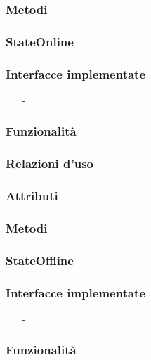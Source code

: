 \subsubsection*{Metodi}

\subsubsection{StateOnline}\label{sec:stateonline}

\subsubsection*{Interfacce implementate}
\begin{itemize}[noitemsep,nolistsep]
  \item[-]
\end{itemize}

\subsubsection*{Funzionalità}

\subsubsection*{Relazioni d'uso}

\subsubsection*{Attributi}

\subsubsection*{Metodi}

\subsubsection{StateOffline}\label{sec:stateoffline}

\subsubsection*{Interfacce implementate}
\begin{itemize}[noitemsep,nolistsep]
  \item[-]
\end{itemize}

\subsubsection*{Funzionalità}

